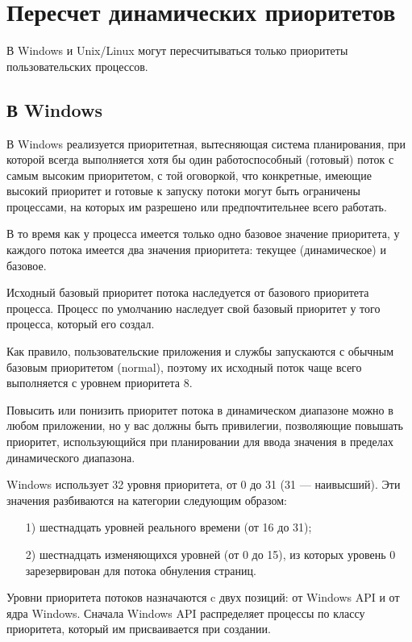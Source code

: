 \documentclass[14pt, a4paper]{extarticle}
\begin{document}
	\section{Пересчет динамических приоритетов}
	В Windows и Unix/Linux могут пересчитываться только приоритеты пользовательских процессов.
	
	\subsection{В Windows}	
	В Windows реализуется приоритетная, вытесняющая система планирования, при
	которой всегда выполняется хотя бы один работоспособный (готовый) поток с самым высоким приоритетом, с той оговоркой, что конкретные, имеющие высокий
	приоритет и готовые к запуску потоки могут быть ограничены процессами, на которых им разрешено или предпочтительнее всего работать.\par
	
	В то время как у процесса имеется только одно базовое значение приоритета, у каждого потока имеется два значения приоритета: текущее (динамическое) и базовое.
	
	Исходный базовый приоритет потока наследуется от базового приоритета процесса.
	Процесс по умолчанию наследует свой базовый приоритет у того процесса, который
	его создал.
	
	Как правило, пользовательские приложения и службы запускаются с обычным
	базовым приоритетом (normal), поэтому их исходный поток чаще всего
	выполняется с уровнем приоритета 8.
	
	Повысить или понизить приоритет потока в динамическом диапазоне можно в
	любом приложении, но у вас должны быть привилегии, позволяющие повышать
	приоритет, использующийся при планировании для ввода значения в пределах
	динамического диапазона. 
	
	
	Windows использует 32 уровня приоритета, от 0 до 31 (31 —
	наивысший). Эти значения разбиваются на категории следующим образом:
	\begin{itemize}
		\item[1)] шестнадцать уровней реального времени (от 16 до 31);
		\item[2)] шестнадцать изменяющихся уровней (от 0 до 15), из которых уровень 0 зарезервирован для потока обнуления страниц. 
	\end{itemize}

	Уровни приоритета потоков назначаются c двух позиций: от Windows API и от ядра
	Windows. Сначала Windows API распределяет процессы по классу приоритета, который им присваивается
	при создании.
	
\end{document}
